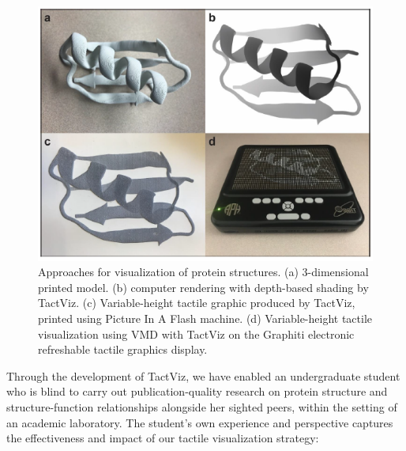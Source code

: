 \documentclass[11.5pt]{sig-alternate} %
\begin{document}
\begin{large}
\begin{figure}[h]
    \centering
    \includegraphics[width=1\linewidth]{fig1.png}
    \caption{Approaches for visualization of protein structures. (a) 3-dimensional printed model. (b) computer rendering with depth-based shading by TactViz. (c) Variable-height tactile graphic produced by TactViz, printed using Picture In A Flash machine. (d) Variable-height tactile visualization using VMD with TactViz on the Graphiti electronic refreshable tactile graphics display.}
    
\end{figure}

Through the development of TactViz, we have enabled an undergraduate student who is blind to carry out publication-quality research on protein structure and structure-function relationships alongside her sighted peers, within the setting of an academic laboratory. The student’s own experience and perspective captures the effectiveness and impact of our tactile visualization strategy:


\end{large}
\end{document}
